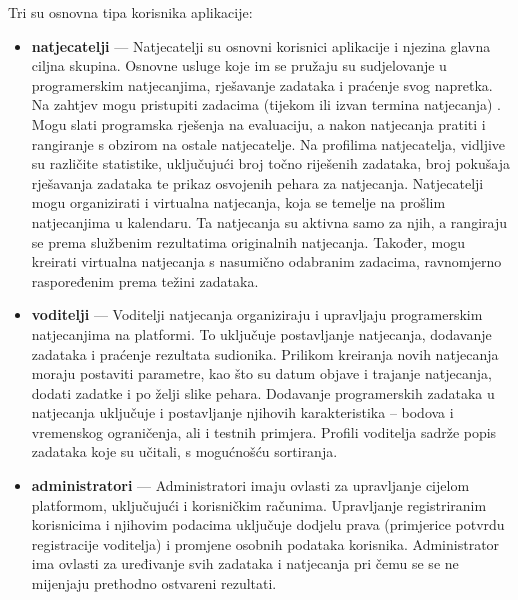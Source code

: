 		Tri su osnovna tipa korisnika aplikacije:
		\begin{itemize}
			\item \textbf{natjecatelji} --- Natjecatelji su osnovni korisnici aplikacije i njezina glavna ciljna skupina. Osnovne usluge koje im se pružaju su sudjelovanje u programerskim natjecanjima, rješavanje zadataka i praćenje svog napretka. Na zahtjev mogu pristupiti zadacima (tijekom ili izvan termina natjecanja) . Mogu slati programska rješenja na evaluaciju, a nakon natjecanja pratiti i rangiranje s obzirom na ostale natjecatelje. Na profilima natjecatelja, vidljive su različite statistike, uključujući broj točno riješenih zadataka, broj pokušaja rješavanja zadataka te prikaz osvojenih pehara za natjecanja. Natjecatelji mogu organizirati i virtualna natjecanja, koja se temelje na prošlim natjecanjima u kalendaru. Ta natjecanja su aktivna samo za njih, a rangiraju se prema službenim rezultatima originalnih natjecanja. Također, mogu kreirati virtualna natjecanja s nasumično odabranim zadacima, ravnomjerno raspoređenim prema težini zadataka.
 			\item \textbf{voditelji} --- Voditelji natjecanja organiziraju i upravljaju programerskim natjecanjima na platformi. To uključuje postavljanje natjecanja, dodavanje zadataka i praćenje rezultata sudionika. Prilikom kreiranja novih natjecanja moraju postaviti parametre, kao što su datum objave i trajanje natjecanja, dodati zadatke i po želji slike pehara. Dodavanje programerskih zadataka u natjecanja uključuje i postavljanje njihovih karakteristika -- bodova i vremenskog ograničenja, ali i testnih primjera. Profili voditelja sadrže popis zadataka koje su učitali, s mogućnošću sortiranja.
			\item \textbf{administratori} --- Administratori imaju ovlasti za upravljanje cijelom platformom, uključujući i korisničkim računima. Upravljanje registriranim korisnicima i njihovim podacima uključuje dodjelu prava (primjerice potvrdu registracije voditelja) i promjene osobnih podataka korisnika. Administrator ima ovlasti za uređivanje svih zadataka i natjecanja pri čemu se se ne mijenjaju prethodno ostvareni rezultati.
		\end{itemize}
		
